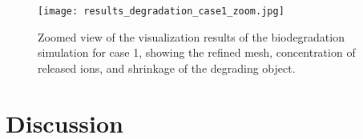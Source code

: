 \begin{figure}[h]
\centering
\medskip
\texttt{[image: results\_degradation\_case1\_zoom.jpg]}
\caption[Zoom view of the results of the biodegradation simulation for case 1]{Zoomed view of the visualization results of the biodegradation simulation for case 1, showing the refined mesh, concentration of released ions, and shrinkage of the degrading object.} \label{fig:infill_results_degradation_case1_zoom}
\end{figure}

\section{Discussion}


\cleardoublepage

